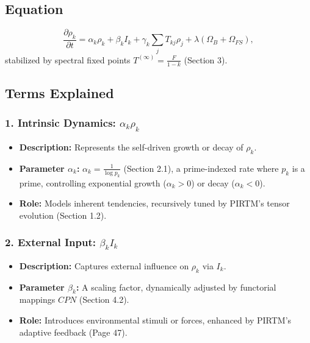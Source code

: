 \documentclass{article}
\theoremstyle{plain}
\theoremstyle{definition}
\begin{document}
\subsection*{Equation}
\begin{equation}
\frac{\partial \rho_k}{\partial t} = \alpha_k \rho_k + \beta_k I_k + \gamma_k \sum_j T_{kj} \rho_j + \lambda (\Omega_B + \Omega_{FS}),
\end{equation}
stabilized by spectral fixed points \( T^{(\infty)} = \frac{F}{1 - k} \) (Section 3).

\subsection*{Terms Explained}

\subsubsection*{1. Intrinsic Dynamics: \(\alpha_k \rho_k\)}
\begin{itemize}
    \item \textbf{Description:} Represents the self-driven growth or decay of \( \rho_k \).
    \item \textbf{Parameter \(\alpha_k\):} \( \alpha_k = \frac{1}{\log p_k} \) (Section 2.1), a prime-indexed rate where \( p_k \) is a prime, controlling exponential growth (\( \alpha_k > 0 \)) or decay (\( \alpha_k < 0 \)).
    \item \textbf{Role:} Models inherent tendencies, recursively tuned by PIRTM’s tensor evolution (Section 1.2).
\end{itemize}

\subsubsection*{2. External Input: \(\beta_k I_k\)}
\begin{itemize}
    \item \textbf{Description:} Captures external influence on \( \rho_k \) via \( I_k \).
    \item \textbf{Parameter \(\beta_k\):} A scaling factor, dynamically adjusted by functorial mappings \( CPN \) (Section 4.2).
    \item \textbf{Role:} Introduces environmental stimuli or forces, enhanced by PIRTM’s adaptive feedback (Page 47).
\end{itemize}
\end{document}
